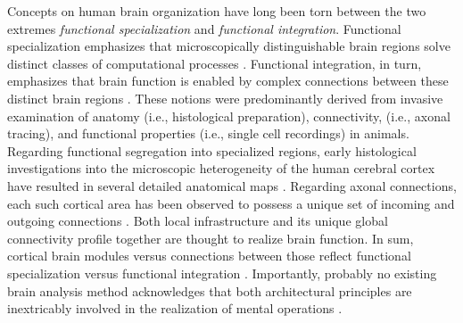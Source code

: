 \documentclass{article} %
\begin{document}
Concepts on human brain organization have long been torn
between the two extremes
\textit{functional specialization} and \textit{functional integration}.
Functional specialization emphasizes that microscopically distinguishable
brain regions solve distinct classes of computational processes
\cite{kanwisher2010functional}.
Functional integration, in turn, emphasizes that brain function
is enabled by complex connections between these
distinct brain regions \cite{sporns14nn}.
%
These notions were predominantly derived from
invasive examination of anatomy (i.e., histological preparation),
connectivity, (i.e., axonal tracing),
and functional properties
(i.e., single cell recordings) in animals.
Regarding functional segregation into specialized regions,
early histological investigations into the microscopic heterogeneity of
the human cerebral cortex have resulted
in several detailed anatomical maps
\cite{brodmann1909vergleichende, vogt1919allgemeine}.
Regarding axonal connections,
each such cortical area has been observed
to possess a unique set of incoming and outgoing connections
\cite{passingham2002, young93monkey, scannell95cat}.
%
Both
local
infrastructure
and its unique global connectivity profile
together are thought to realize brain function.
%
In sum,
cortical brain modules versus connections between those
reflect 
functional specialization versus functional integration
\cite{friston2002beyond, mesulam_sensation}.
Importantly,
probably no existing brain analysis method acknowledges that
both architectural principles are inextricably involved
in the realization of mental operations
\cite{tononi1998complexity, saygin2012}.
\end{document}

